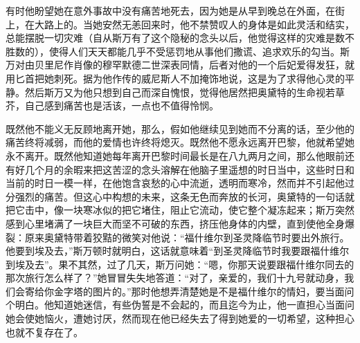 \par 有时他盼望她在意外事故中没有痛苦地死去，因为她是从早到晚总在外面，在街上，在大路上的。当她安然无恙回来时，他不禁赞叹人的身体是如此灵活和结实，总能摆脱一切灾难（自从斯万有了这个隐秘的念头以后，他觉得这样的灾难是数不胜数的），使得人们天天都能几乎不受惩罚地从事他们撒谎、追求欢乐的勾当。斯万对由贝里尼作肖像的穆罕默德二世深表同情，后者对他的一个后妃爱得发狂，就用匕首把她刺死。据为他作传的威尼斯人不加掩饰地说，这是为了求得他心灵的平静。然后斯万又为他只想到自己而深自愧恨，觉得他居然把奥黛特的生命视若草芥，自己感到痛苦也是活该，一点也不值得怜悯。
\par 既然他不能义无反顾地离开她，那么，假如他继续见到她而不分离的话，至少他的痛苦终将减弱，而他的爱情也许终将熄灭。既然他不愿永远离开巴黎，他就希望她永不离开。既然他知道她每年离开巴黎时间最长是在八九两月之间，那么他眼前还有好几个月的余暇来把这苦涩的念头溶解在他脑子里遥想的时日当中，这些时日和当前的时日一模一样，在他饱含哀愁的心中流逝，透明而寒冷，然而并不引起他过分强烈的痛苦。但这心中构想的未来，这条无色而奔放的长河，奥黛特的一句话就把它击中，像一块寒冰似的把它堵住，阻止它流动，使它整个凝冻起来；斯万突然感到心里堵满了一块巨大而坚不可破的东西，挤压他身体的内壁，直到使他全身爆裂：原来奥黛特带着狡黠的微笑对他说：“福什维尔到圣灵降临节时要出外旅行。他要到埃及去，”斯万顿时就明白，这话就意味着“到圣灵降临节时我要跟福什维尔到埃及去”。果不其然，过了几天，斯万问她：“嗯，你那天说要跟福什维尔同去的那次旅行怎么样了？”她冒冒失失地答道：“对了，亲爱的，我们十九号就动身，我们会寄给你金字塔的图片的。”那时他想弄清楚她是不是福什维尔的情妇，要当面问个明白。他知道她迷信，有些伪誓是不会起的，而且迄今为止，他一直担心当面问她会使她恼火，遭她讨厌，然而现在他已经失去了得到她爱的一切希望，这种担心也就不复存在了。

